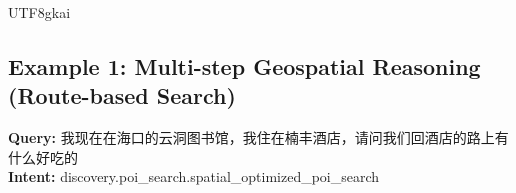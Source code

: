 \begin{CJK*}{UTF8}{gkai} %


\subsection{Example 1: Multi-step Geospatial Reasoning (Route-based Search)}
\begin{tcolorbox}[
    breakable,
    enhanced,
    colframe=color_amapblue,
    colback=mycolor,
    coltitle=white,
    title = {\textbf{Case Study: Route-based Dining Recommendation}},
    fonttitle=\bfseries
]

\textbf{Query:} 我现在在海口的云洞图书馆，我住在楠丰酒店，请问我们回酒店的路上有什么好吃的\\
\textbf{Intent:} discovery.poi\_search.spatial\_optimized\_poi\_search
\tcblower


\end{tcolorbox}
\end{CJK*}
